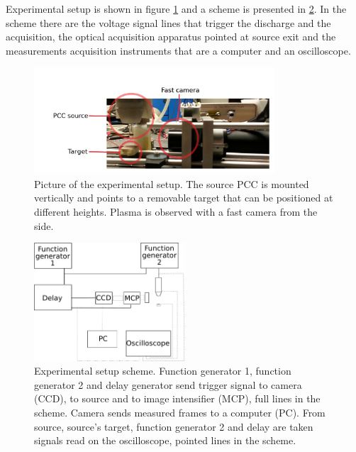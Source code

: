 Experimental setup is shown in figure \ref{fig:fotosetup} and a scheme is presented in \ref{fig:schemashape}. In the scheme there are the voltage signal lines that trigger the discharge and the acquisition, the optical acquisition apparatus pointed at source exit and the measurements acquisition instruments that are a computer and an oscilloscope. 
\begin{figure}
 \centering
 \includegraphics[width=0.8\textwidth]{Images/Shape/app_pic.png}
 \caption{Picture of the experimental setup. The source PCC is mounted vertically and points to a removable target that can be positioned at different heights. Plasma is observed with a fast camera from the side.}
 \label{fig:fotosetup}
\end{figure}
\begin{figure}
 \centering
 \includegraphics[width=0.5\textwidth]{Images/Shape/acq_ottica.png}
 \caption{Experimental setup scheme. Function generator 1, function generator 2 and delay generator send trigger signal to camera (CCD), to source and to image intensifier (MCP), full lines in the scheme. Camera sends measured frames to a computer (PC). From source, source's target, function generator 2 and delay are taken signals read on the oscilloscope, pointed lines in the scheme.}
 \label{fig:schemashape}
\end{figure}

